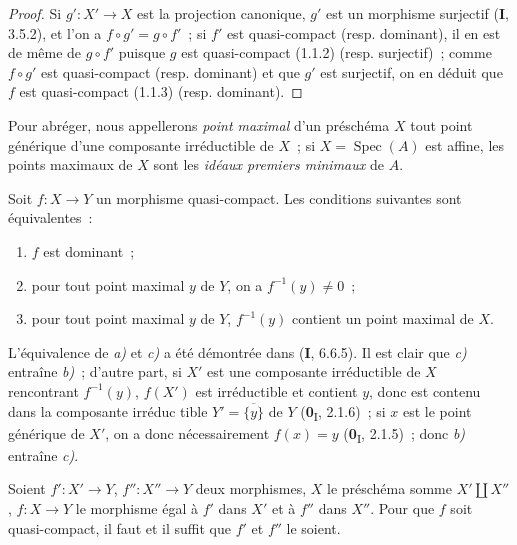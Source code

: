 \begin{proof}
Si $g':X'\to X$ est la projection canonique, $g'$ est un morphisme surjectif
(\textbf{I}, 3.5.2), et l'on a $f\circ g'=g\circ f'$~; si $f'$ est quasi-compact
(resp. dominant), il en est de même de $g\circ f'$ puisque $g$ est
quasi-compact (1.1.2) (resp. surjectif)~; comme $f\circ g'$ est quasi-compact
(resp. dominant) et que $g'$ est surjectif, on en déduit que $f$ est
quasi-compact (1.1.3) (resp. dominant).
\end{proof}

Pour abréger, nous appellerons \emph{point maximal} d'un préschéma $X$ tout
point générique d'une composante irréductible de $X$~; si
$X=\operatorname{Spec}(A)$ est affine, les points maximaux de $X$ sont les
\emph{idéaux premiers minimaux} de $A$.

\begin{proposition}[1.1.5]
\label{IV.1.1.5-fr}
Soit $f:X\to Y$ un morphisme quasi-compact. Les conditions suivantes sont
équivalentes~:
\begin{enumerate}
  \item[\textup{a)}] $f$ est dominant~;
  \item[\textup{b)}] pour tout point maximal $y$ de $Y$, on a
  $f^{-1}(y)\neq 0$~;
  \item[\textup{c)}] pour tout point maximal $y$ de $Y$, $f^{-1}(y)$ contient un point
  maximal de $X$.
\end{enumerate}
\end{proposition}

L'équivalence de \emph{a)} et \emph{c)} a été démontrée dans (\textbf{I}, 6.6.5). Il
est clair que \emph{c)} entraîne \emph{b)}~; d'autre part, si $X'$ est une
composante irréductible de $X$ rencontrant $f^{-1}(y)$, $f(X')$ est
irréductible et contient $y$, donc est contenu dans la composante irréduc%
tible
$Y'=\overline{\{y\}}$ de $Y$ (\textbf{0}\textsubscript{I}, 2.1.6)~; si $x$ est le
point générique de $X'$, on a donc nécessairement $f(x)=y$
(\textbf{0}\textsubscript{I}, 2.1.5)~; donc \emph{b)} entraîne \emph{c)}.

\begin{proposition}[1.1.6]
\label{IV.1.1.6-fr}
Soient $f':X'\to Y$, $f'':X''\to Y$ deux morphismes, $X$ le préschéma somme
$X'\amalg X''$, $f:X\to Y$ le morphisme égal à $f'$ dans $X'$ et à $f''$
dans $X''$. Pour que $f$ soit quasi-compact, il faut et il suffit que $f'$ et
$f''$ le soient.
\end{proposition}

